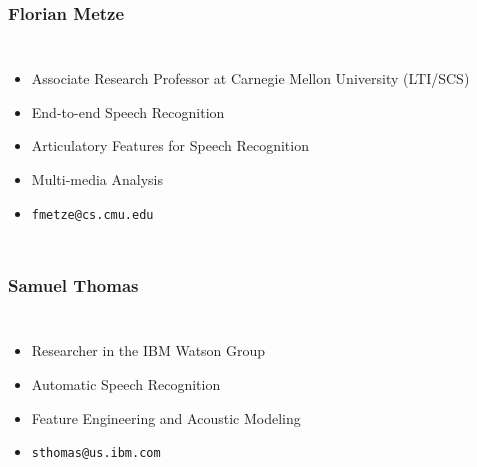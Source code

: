 \begin{frame}
  \frametitle{Florian Metze}
  \begin{columns}[T]
    \column{2in}
    \begin{itemize}
    \item Associate Research Professor at Carnegie Mellon University (LTI/SCS)
    \item End-to-end Speech Recognition
    \item Articulatory Features for Speech Recognition
    \item Multi-media Analysis
    \item \texttt{fmetze@cs.cmu.edu}
    \end{itemize}
    \column{2in}
  \end{columns}
\end{frame}

\begin{frame}
  \frametitle{Samuel Thomas}
  \begin{columns}[T]
    \column{2in}
    \begin{itemize}
    \item Researcher in the IBM Watson Group
    \item Automatic Speech Recognition
    \item Feature Engineering and Acoustic Modeling
    \item \texttt{sthomas@us.ibm.com}
    \end{itemize}
    \column{2in}
  \end{columns}
\end{frame}

